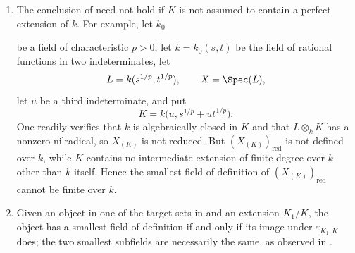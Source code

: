 \begin{remarks}[4.8.15]
\label{IV.4.8.15}
\begin{enumerate}
\item[\rm(i)]
\label{IV.4.8.15.i}
The conclusion of  need not hold if $K$ is not
assumed to contain a perfect extension of $k$.
For example, let $k_0$


be a field of characteristic $p>0$, let
$k=k_0(s,t)$ be the field of rational functions in two
indeterminates, let
\[
L=k(s^{1/p},t^{1/p}),
\qquad
X=\Spec(L),
\]
let $u$ be a third indeterminate, and put
\[
K=k\bigl(u,s^{1/p}+ut^{1/p}\bigr).
\]
One readily verifies that $k$ is algebraically closed in $K$ and that
$L\otimes_kK$ has a nonzero nilradical, so $X_{(K)}$ is not reduced.
But $(X_{(K)})_{\mathrm{red}}$ is not defined over $k$, while $K$
contains no intermediate extension of finite degree over $k$ other
than $k$ itself.
Hence the smallest field of definition of
$(X_{(K)})_{\mathrm{red}}$ cannot be finite over $k$.

\item[\rm(ii)]
\label{IV.4.8.15.ii}
Given an object in one of the target sets in  and an
extension $K_1/K$, the object has a smallest field of definition if
and only if its image under $\varepsilon_{K_1,K}$ does; the two smallest
subfields are necessarily the same, as observed in
.
\end{enumerate}
\end{remarks}
